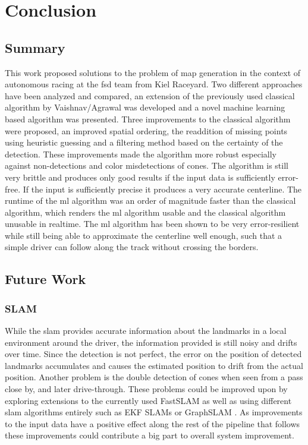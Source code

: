 \chapter{Conclusion}
\label{chap:end}

\section{Summary}
This work proposed solutions to the problem of map generation in the context of autonomous racing at the \ac{fsd} team from Kiel Raceyard. Two different approaches have been analyzed and compared, an extension of the previously used classical algorithm by Vaishnav/Agrawal was developed and a novel machine learning based algorithm was presented. Three improvements to the classical algorithm were proposed, an improved spatial ordering, the readdition of missing points using heuristic guessing and a filtering method based on the certainty of the detection. These improvements made the algorithm more robust especially against non-detections and color misdetections of cones. The algorithm is still very brittle and produces only good results if the input data is sufficiently error-free. If the input is sufficiently precise it produces a very accurate centerline. The runtime of the \ac{ml} algorithm was an order of magnitude faster than the classical algorithm, which renders the \ac{ml} algorithm usable and the classical algorithm unusable in realtime. The \ac{ml} algorithm has been shown to be very error-resilient while still being able to approximate the centerline well enough, such that a simple driver can follow along the track without crossing the borders.

\section{Future Work}
\subsection{SLAM} 
While the \ac{slam} provides accurate information about the landmarks in a local environment around the driver, the information provided is still noisy and drifts over time. Since the detection is not perfect, the error on the position of detected landmarks accumulates and causes the estimated position to drift from the actual position. Another problem is the double detection of cones when seen from a pass close by, and later drive-through. These problems could be improved upon by exploring extensions to the currently used FastSLAM \cite{FastSLAM2002} as well as using different \ac{slam} algorithms entirely such as EKF SLAMs \cite{EKFSLAM1986} or GraphSLAM \cite{graphSLAM2006}. As improvements to the input data have a positive effect along the rest of the pipeline that follows these improvements could contribute a big part to overall system improvement.

